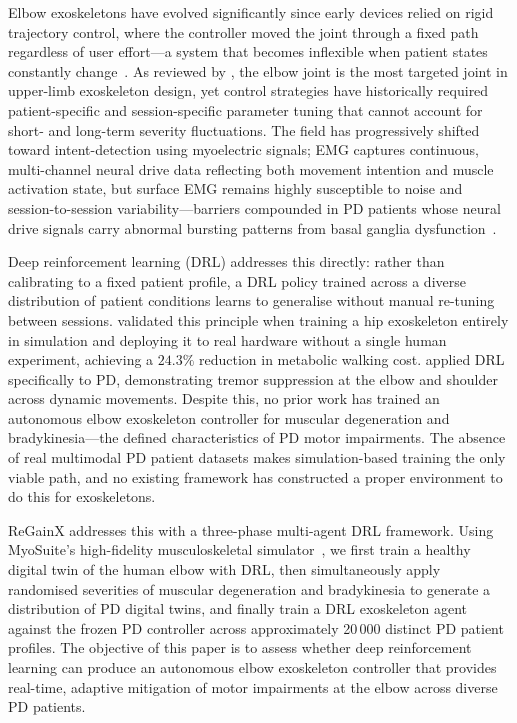 \documentclass{article}
\begin{document}
Elbow exoskeletons have evolved significantly since early devices relied
on rigid trajectory control, where the controller moved the joint through
a fixed path regardless of user effort---a system that becomes inflexible
when patient states constantly change~\citep{gasperina2021, myoelectric2022}.
As reviewed by \citet{supriyono2025}, the elbow joint is the most targeted
joint in upper-limb exoskeleton design, yet control strategies have
historically required patient-specific and session-specific parameter
tuning that cannot account for short- and long-term severity fluctuations.
The field has progressively shifted toward intent-detection using
myoelectric signals; EMG captures continuous, multi-channel neural drive
data reflecting both movement intention and muscle activation state, but
surface EMG remains highly susceptible to noise and session-to-session
variability---barriers compounded in PD patients whose neural drive
signals carry abnormal bursting patterns from basal ganglia
dysfunction~\citep{supriyono2025, mdpi2025}.

Deep reinforcement learning (DRL) addresses this directly: rather than
calibrating to a fixed patient profile, a DRL policy trained across a
diverse distribution of patient conditions learns to generalise without
manual re-tuning between sessions. \citet{luo2024} validated this
principle when training a hip exoskeleton entirely in simulation and
deploying it to real hardware without a single human experiment, achieving
a $24.3\%$ reduction in metabolic walking cost. \citet{endrei2025} applied
DRL specifically to PD, demonstrating tremor suppression at the elbow and
shoulder across dynamic movements. Despite this, no prior work has trained
an autonomous elbow exoskeleton controller for muscular degeneration and
bradykinesia---the defined characteristics of PD motor impairments. The
absence of real multimodal PD patient datasets makes simulation-based
training the only viable path, and no existing framework has constructed a
proper environment to do this for exoskeletons.

ReGainX addresses this with a three-phase multi-agent DRL framework.
Using MyoSuite's high-fidelity musculoskeletal simulator~\citep{caggiano2022},
we first train a healthy digital twin of the human elbow with DRL, then
simultaneously apply randomised severities of muscular degeneration and
bradykinesia to generate a distribution of PD digital twins, and finally
train a DRL exoskeleton agent against the frozen PD controller across
approximately 20\,000 distinct PD patient profiles. The objective of this
paper is to assess whether deep reinforcement learning can produce an
autonomous elbow exoskeleton controller that provides real-time, adaptive
mitigation of motor impairments at the elbow across diverse PD patients.
\end{document}
